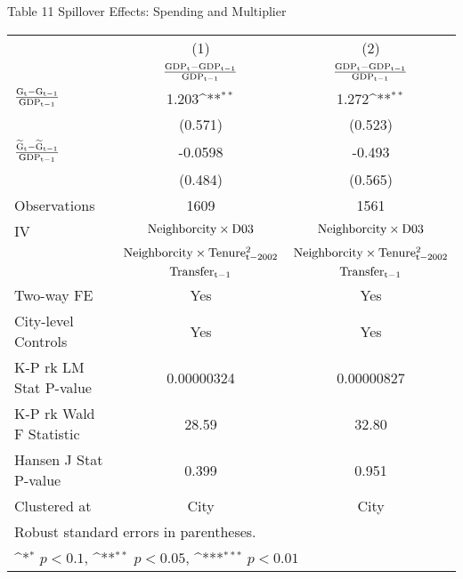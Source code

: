 \documentclass[11pt,a4paper]{article}
\begin{document}
\newpage

\begin{center}
Table 11 Spillover Effects: Spending and Multiplier \\
\medskip
\begin{scriptsize}
{
\def\sym#1{\ifmmode^{#1}\else\(^{#1}\)\fi}
\begin{tabular}{l*{2}{c}}
\hline\hline
            &\multicolumn{1}{c}{(1)}&\multicolumn{1}{c}{(2)}\\
            &\multicolumn{1}{c}{$\rm \frac{ GDP_{t}-GDP_{t-1}}{GDP_{t-1}}$}&\multicolumn{1}{c}{$\rm \frac{ GDP_{t}-GDP_{t-1}}{GDP_{t-1}}$}\\
\hline
$\rm \frac{ G_{t}-G_{t-1}}{GDP_{t-1}}$     &       1.203\sym{**} &      1.272\sym{**} \\
            &     (0.571)         &     (0.523)         \\
[1em]
$\rm \frac{ \widetilde{G}_{t}-\widetilde{G}_{t-1}}{GDP_{t-1}}$  &     -0.0598         &      -0.493      \\
            &     (0.484)         &   (0.565)  \\
\hline
Observations       &        1609         &         1561         \\
IV         & ${\rm Neighborcity \times D03}$   &  ${\rm Neighborcity \times D03}$         \\
         &    ${\rm Neighborcity \times Tenure_{t-2002}^2}$   &    ${\rm Neighborcity \times Tenure_{t-2002}^2}$  \\
           &      $\rm Transfer_{t-1}$     &     $\rm Transfer_{t-1}$  \\
Two-way FE    &   Yes   & Yes          \\
City-level Controls &   Yes         &  Yes        \\
K-P rk LM Stat P-value        &  0.00000324         &    0.00000827          \\
K-P rk Wald F Statistic     &       28.59         &    32.80        \\
Hansen J Stat P-value        &       0.399         &      0.951          \\
Clustered at    &        City       &        City        \\
\hline\hline
\multicolumn{3}{l}{\footnotesize Robust standard errors in parentheses.}\\
\multicolumn{3}{l}{\footnotesize \sym{*} \(p<0.1\), \sym{**} \(p<0.05\), \sym{***} \(p<0.01\)}\\

\end{tabular}}
\end{scriptsize}
\end{center}
\end{document}

